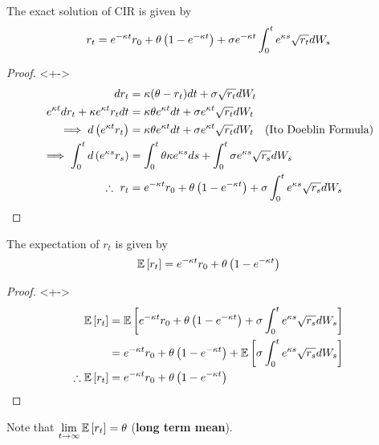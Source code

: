 \begin{frame}
	\begin{proposition}
		The exact solution of CIR is given by
		\[
			r_t = e^{-\kappa t} r_0 + \theta \left( 1 - e^{-\kappa t} \right) +
			\sigma e^{-\kappa t} \int_0^t e^{\kappa s} \sqrt{r_t} dW_s
		\]
	\end{proposition}
	\begin{proof}<+->
		\begin{align*}
			dr_t &= \kappa(\theta - r_t)dt + \sigma \sqrt{r_t} dW_t \\
			e^{\kappa t} dr_t + \kappa e^{\kappa t} r_t dt
				&= \kappa\theta e^{\kappa t}dt +
				\sigma e^{\kappa t} \sqrt{r_t} dW_t \\
			\implies d\left( e^{\kappa t} r_t \right) &=
				\kappa\theta e^{\kappa t}dt +
				\sigma e^{\kappa t} \sqrt{r_t} dW_t
				\quad \text{(Ito Doeblin Formula)} \\
			\implies \int_0^t d\left( e^{\kappa s} r_s \right) &= \int_0^t
				\theta\kappa e^{\kappa s}ds +
				\int_0^t \sigma e^{\kappa s} \sqrt{r_s} dW_s \\
			\therefore\ r_t &= e^{-\kappa t} r_0 + \theta
				\left( 1 - e^{-\kappa t} \right) + \sigma
				\int_0^t e^{\kappa s} \sqrt{r_s} dW_s
		\end{align*}
	\end{proof}
\end{frame}


\begin{frame}
	\begin{proposition}
		The expectation of \( r_t \) is given by
		\[ \displaystyle \mathbb{E} \left[ r_t \right] = e^{-\kappa t} r_0
		+ \theta \left( 1 - e^{-\kappa t} \right) \]
	\end{proposition}
	\begin{proof}<+->
		\begin{align*}
			\mathbb{E} \left[ r_t \right] &= \mathbb{E} \left[ e^{-\kappa t} r_0 + \theta
				\left( 1 - e^{-\kappa t} \right) + \sigma
				\int_0^t e^{\kappa s} \sqrt{r_s} dW_s \right] \\
			&= e^{-\kappa t} r_0 + \theta\left( 1 - e^{-\kappa t} \right) +
				\mathbb{E} \left[ \sigma \int_0^t e^{\kappa s} \sqrt{r_s} dW_s \right] \\
			\therefore \mathbb{E} \left[ r_t \right] &= e^{-\kappa t} r_0 +
			\theta \left( 1 - e^{-\kappa t} \right)
		\end{align*}
	\end{proof}
	Note that \( \displaystyle \lim_{t \to \infty} \mathbb{E} \left[ r_t \right] = \theta \)
	(\textbf{long term mean}).
\end{frame}


